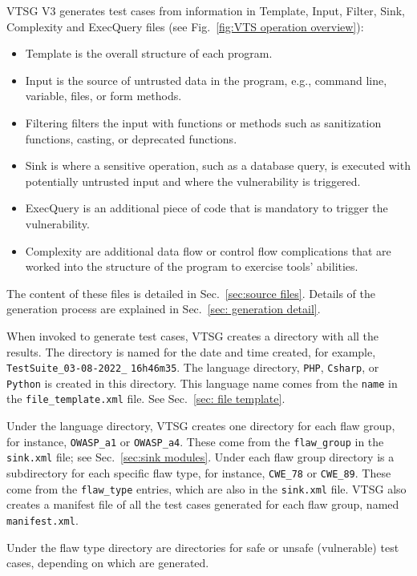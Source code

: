 \documentclass[12pt]{article}
\begin{document}
VTSG V3 generates test cases from information in Template, Input,
Filter, Sink, Complexity and ExecQuery files 
(see Fig.~\ref{fig:VTS operation overview}):
\begin{itemize}
 \item Template is the overall structure of each program.
 \item Input is the source of untrusted data in the program, e.g., 
 command line, variable, files, or form methods.
 \item Filtering filters the input with functions or methods such as sanitization
   functions, casting, or deprecated functions.
 \item Sink is where a sensitive operation, such as a database query, 
 is executed with potentially untrusted input and where the 
 vulnerability is triggered.
 \item ExecQuery is an additional piece of code that is mandatory to 
 trigger the vulnerability.
 \item Complexity are additional data flow or control flow complications that are
   worked into the structure of the program to exercise tools' abilities.
\end{itemize}
The content of these files is detailed in
Sec.~\ref{sec:source files}.
Details of the generation process are explained in
Sec.~\ref{sec: generation detail}.

\label{sec:case directory structure}
When invoked to generate test cases, VTSG creates a directory with all the results.
The directory is named for the date and time created, for example,
\verb|TestSuite_03-08-2022_| \verb|16h46m35|.
The language directory, \verb|PHP|,
\verb|Csharp|, or \verb|Python| is created in this directory.
This language name comes from the \verb|name|
in the \verb|file_template.xml| file.  See Sec.~\ref{sec: file template}.

Under the language directory, VTSG creates one directory for each flaw group, for
instance, \verb|OWASP_a1| or \verb|OWASP_a4|.  These come from the \verb|flaw_group|
in the \verb|sink.xml| file; see Sec.~\ref{sec:sink modules}.
Under each flaw group directory is a subdirectory for each specific flaw type, for
instance, \verb|CWE_78| or \verb|CWE_89|.  These come from the \verb|flaw_type|
entries, which are also in the \verb|sink.xml| file.
VTSG also creates a manifest file of all the test cases generated for each flaw
group, named
\verb|manifest.xml|.

Under the flaw type directory are directories for safe or unsafe
(vulnerable) test cases, depending on
which are generated.
\end{document}

